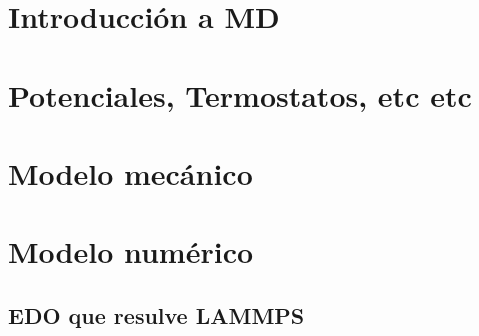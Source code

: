 \section{Introducción a MD}
\label{S2_2}


\section{Potenciales, Termostatos, etc etc}
\label{S2_3}



\section{Modelo mecánico}
\label{S2_4}



\section{Modelo numérico}
\label{S2_5}



\subsection{EDO que resulve LAMMPS}
\label{S2_5_1}